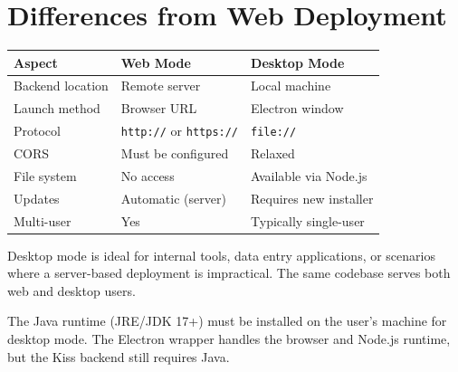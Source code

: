 \section{Differences from Web Deployment}
\label{sec:desk-differences}

\begin{longtable}{P{3.5cm}P{3.5cm}P{3cm}}
\toprule
\textbf{Aspect} & \textbf{Web Mode} & \textbf{Desktop Mode} \\
\midrule
\endhead
Backend location & Remote server & Local machine \\
Launch method & Browser URL & Electron window \\
Protocol & \texttt{http://} or \texttt{https://} & \texttt{file://} \\
CORS & Must be configured & Relaxed \\
File system & No access & Available via Node.js \\
Updates & Automatic (server) & Requires new installer \\
Multi-user & Yes & Typically single-user \\
\bottomrule
\end{longtable}

\begin{tipbox}
Desktop mode is ideal for internal tools, data entry applications, or scenarios where a server-based deployment is impractical.  The same codebase serves both web and desktop users.
\end{tipbox}

\begin{notebox}
The Java runtime (JRE/JDK 17+) must be installed on the user's machine for desktop mode.  The Electron wrapper handles the browser and Node.js runtime, but the Kiss backend still requires Java.
\end{notebox}

